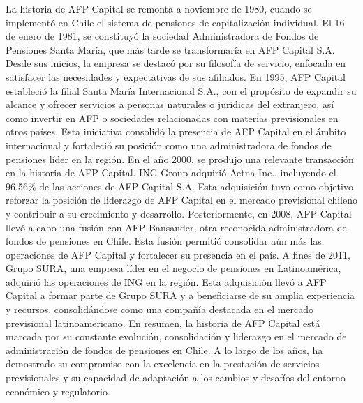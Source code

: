 La historia de AFP Capital se remonta a noviembre de 1980, cuando se implementó en Chile el sistema de pensiones de capitalización individual. El 16 de enero de 1981, se constituyó la sociedad Administradora de Fondos de Pensiones Santa María, que más tarde se transformaría en AFP Capital S.A. Desde sus inicios, la empresa se destacó por su filosofía de servicio, enfocada en satisfacer las necesidades y expectativas de sus afiliados. 
En 1995, AFP Capital estableció la filial Santa María Internacional S.A., con el propósito de expandir su alcance y ofrecer servicios a personas naturales o jurídicas del extranjero, así como invertir en AFP o sociedades relacionadas con materias previsionales en otros países. Esta iniciativa consolidó la presencia de AFP Capital en el ámbito internacional y fortaleció su posición como una administradora de fondos de pensiones líder en la región. 
En el año 2000, se produjo una relevante transacción en la historia de AFP Capital. ING Group adquirió Aetna Inc., incluyendo el 96,56\% de las acciones de AFP Capital S.A. Esta adquisición tuvo como objetivo reforzar la posición de liderazgo de AFP Capital en el mercado previsional chileno y contribuir a su crecimiento y desarrollo. 
Posteriormente, en 2008, AFP Capital llevó a cabo una fusión con AFP Bansander, otra reconocida administradora de fondos de pensiones en Chile. Esta fusión permitió consolidar aún más las operaciones de AFP Capital y fortalecer su presencia en el país. A fines de 2011, Grupo SURA, una empresa líder en el negocio de pensiones en Latinoamérica, adquirió las operaciones de ING en la región. Esta adquisición llevó a AFP Capital a formar parte de Grupo SURA y a beneficiarse de su amplia experiencia y recursos, consolidándose como una compañía destacada en el mercado previsional latinoamericano. En resumen, la historia de AFP Capital está marcada por su constante evolución, consolidación y liderazgo en el mercado de administración de fondos de pensiones en Chile. A lo largo de los años, ha demostrado su compromiso con la excelencia en la prestación de servicios previsionales y su capacidad de adaptación a los cambios y desafíos del entorno económico y regulatorio.

